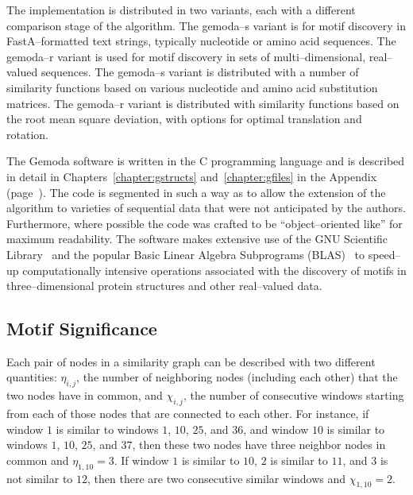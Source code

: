     The implementation is distributed in two variants,
    each with a different comparison stage of the
    algorithm.  The gemoda--s variant is for motif
    discovery in FastA--formatted text strings,
    typically nucleotide or amino acid sequences.
    The gemoda--r variant is used for motif discovery
    in sets of multi--dimensional, real--valued
    sequences.  The gemoda--s variant is distributed
    with a number of similarity functions based on
    various nucleotide and amino acid substitution
    matrices.  The gemoda--r variant is distributed
    with similarity functions based on the root
    mean square deviation, with options for optimal
    translation and rotation.

    The Gemoda software is written in the C programming language and
    is described in detail in Chapters~\ref{chapter:gstructs} and~\ref{chapter:gfiles}
    in the Appendix (page~\pageref{chapter:gstructs}).  The code is
    segmented in such a way as to allow the extension of the
    algorithm to varieties of sequential data that were not
    anticipated by the authors.  Furthermore, where possible the
    code was crafted to be ``object--oriented like'' for maximum
    readability.  The software makes extensive use of the GNU
    Scientific Library~\cite{galassi2003gnu} and the popular Basic Linear
    Algebra Subprograms
    (BLAS)~\cite{blackford2002updated,dongarra2002basicI,dongarra2002basicII}
    to speed--up computationally intensive operations associated
    with the discovery of motifs in three--dimensional protein
    structures and other real--valued data.

    \subsection{Motif Significance}
    Each pair of nodes in a similarity graph can be described with
    two different quantities: $\eta_{i,j}$, the number of neighboring nodes
    (including each other) that the two nodes have in common,
    and $\chi_{i,j}$, the number of consecutive windows starting from each
    of those nodes that are connected to each other.  For instance,
    if window $1$ is similar to windows $1$, $10$, $25$, and $36$,
    and window $10$ is similar to windows $1$, $10$, $25$, and $37$,
    then these two nodes have three neighbor nodes in common and
    $\eta_{1,10} = 3$.  If window $1$ is similar to $10$, $2$ is similar
    to $11$, and $3$ is not similar to $12$, then there are two
    consecutive similar windows and $\chi_{1,10} = 2$.

